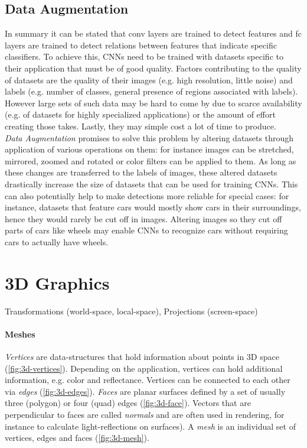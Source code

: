 \subsection{Data Augmentation}
In summary it can be stated that \ac{conv} layers are trained to detect features and \ac{fc} layers are trained to detect relations between features that indicate specific classifiers. To achieve this, \acp{CNN} need to be trained with datasets specific to their application that must be of good quality. Factors contributing to the quality of datasets are the quality of their images (e.g. high resolution, little noise) and labels (e.g. number of classes, general presence of regions associated with labels). However large sets of such data may be hard to come by due to scarce availability (e.g. of datasets for highly specialized applications) or the amount of effort creating those takes. Lastly, they may simple cost a lot of time to produce.\\
\textit{Data Augmentation} promises to solve this problem by altering datasets through application of various operations on them: for instance images can be stretched, mirrored, zoomed and rotated or color filters can be applied to them. As long as these changes are transferred to the labels of images, these altered datasets drastically increase the size of datasets that can be used for training \acp{CNN}. This can also potentially help to make detections more reliable for special cases: for instance, datasets that feature cars would mostly show cars in their surroundings, hence they would rarely be cut off in images. Altering images so they cut off parts of cars like wheels may enable \acp{CNN} to recognize cars without requiring cars to actually have wheels.

\section{3D Graphics}

Transformations (world-space, local-space), Projections (screen-space)

\paragraph{Meshes} \textit{Vertices} are data-structures that hold information about points in 3D space (\ref{fig:3d-vertices}). Depending on the application, vertices can hold additional information, e.g. color and reflectance. Vertices can be connected to each other via \textit{edges} (\ref{fig:3d-edges}). \textit{Faces} are planar surfaces defined by a set of usually three (polygon) or four (quad) edges (\ref{fig:3d-face}). Vectors that are perpendicular to faces are called \textit{normals} and are often used in rendering, for instance to calculate light-reflections on surfaces). A \textit{mesh} is an individual set of vertices, edges and faces (\ref{fig:3d-mesh}). 

